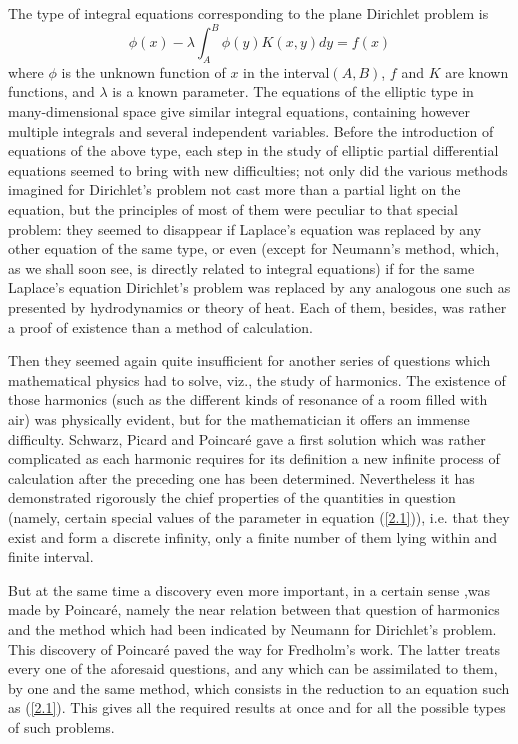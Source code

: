 \documentclass[12pt,oneside]{book}
\begin{document}
The type of integral equations corresponding to the plane Dirichlet problem is
\begin{equation}
    \label{2.1}
    \phi(x)-\lambda\int_A^B\phi(y)K(x,y)dy=f(x)
\end{equation}
where $\phi$ is the unknown function of $x$ in the interval$(A,B)$, $f$ and $K$
are known functions, and $\lambda$ is a known parameter. The equations of the
elliptic type in many-dimensional space give similar integral equations,
containing however multiple integrals and several independent variables. Before
the introduction of equations of the above type, each step in the study of
elliptic partial differential equations seemed to bring with new difficulties;
not only did the various methods imagined for Dirichlet's problem not cast more
than a partial light on the equation, but the principles of most of them were
peculiar to that special problem: they seemed to disappear if Laplace's equation
was replaced by any other equation of the same type, or even (except for
Neumann's method, which, as we shall soon see, is directly related to integral
equations) if for the same Laplace's equation Dirichlet's problem was replaced
by any analogous one such as presented by hydrodynamics or theory of heat. Each
of them, besides, was rather a proof of existence than a method of calculation.
\par

Then they seemed again quite insufficient for another series of questions which
mathematical physics had to solve, viz., the study of harmonics. The existence
of those harmonics (such as the different kinds of resonance of a room filled
with air) was physically evident, but for the mathematician it offers an immense
difficulty. Schwarz, Picard and Poincar\'e gave a first solution which was
rather complicated as each harmonic requires for its definition a new infinite
process of calculation after the preceding one has been determined. Nevertheless
it has demonstrated rigorously the chief properties of the quantities in
question (namely, certain special values of the parameter in equation
(\ref{2.1})), i.e. that they exist and form a discrete infinity, only a finite
number of them lying within and finite interval. \par

But at the same time a discovery even more important, in a certain sense ,was
made by Poincar\'e, namely the near relation between that question of harmonics
and the method which had been indicated by Neumann for Dirichlet's problem. This
discovery of Poincar\'e paved the way for Fredholm's work. The latter treats
every one of the aforesaid questions, and any which can be assimilated to them,
by one and the same method, which consists in the reduction to an equation such
as (\ref{2.1}). This gives all the required results at once and for all the
possible types of such problems. \par
\end{document}
